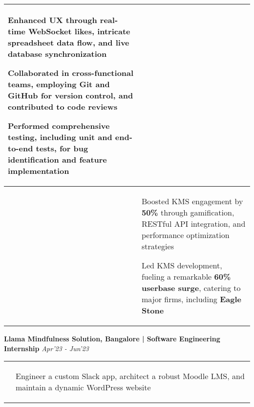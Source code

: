\documentclass[10pt]{extarticle}
\begin{document}
{\begin{flushleft}
\begin{center}
\begin{tabularx}{\textwidth}{ p{1.7cm} | X }
\begin{tabitemize}
    \item Enhanced UX through \textbf{real-time WebSocket likes}, intricate \textbf{spreadsheet data flow}, and \textbf{live database} synchronization
    \item Collaborated in \textbf{cross-functional teams}, employing \textbf{Git} and \textbf{GitHub} for version control, and contributed to code reviews
    \item Performed comprehensive testing, including unit and \textbf{end-to-end tests}, for bug identification and \textbf{feature implementation}
\end{tabitemize}\\

\hline
\centering\multirow{1}{*}{\textbf{Impact}}& 
\begin{tabitemize}
\item  Boosted KMS engagement by\textbf{ 50\% }through gamification, RESTful API integration, and performance optimization strategies
    \item  Led KMS development, fueling a remarkable \textbf{60\% userbase surge}, catering to major firms, including \textbf{Eagle Stone}
\end{tabitemize}
\end{tabularx}
\end{center}
\begin{tcolorbox}[center, width=20.7cm, colback=black!10]
\textbf{Llama Mindfulness Solution, Bangalore | Software Engineering Internship}  \hfill\hfill\textcolor{black!80}{\small \textit{Apr'23 - Jun'23}}
\end{tcolorbox}
\vspace{-10pt}
\begin{center}
\begin{tabularx}{\textwidth}{ p{1.7cm} | X }
\centering\multirow{1}{*}{\textbf{Objective}} & 
\begin{tabitemize}
    \item  Engineer a custom Slack app, architect a robust Moodle LMS, and maintain a dynamic WordPress website
   

\end{tabitemize}
\end{tabularx}
\end{center}
\end{flushleft}}
\end{document}
